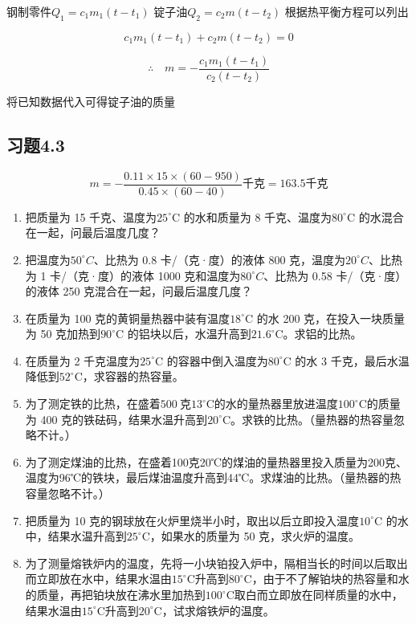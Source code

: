 钢制零件\(Q_{1}=c_{1}m_{1}(t-t_{1})\) 锭子油\(Q_{2}=c_{2}m(t-t_{2})\)
根据热平衡方程可以列出

\[
c _ {1} m _ {1} (t - t _ {1}) + c _ {2} m (t - t _ {2}) = 0
\]

\[
\therefore \quad m = - \frac {c _ {1} m _ {1} (t - t _ {1})}{c _ {2} (t - t _ {2})}
\]

将已知数据代入可得锭子油的质量

\subsection{习题4.3}\label{ux4e60ux98984.3}

\[
m = - \frac {0.11 \times 15 \times (60 - 950)}{0.45 \times (60 - 40)} \text{千克} = 163.5 \text{千克}
\]

\begin{enumerate}
\def\labelenumi{\arabic{enumi}.}
\item
  把质量为 15 千克、温度为\(25^{\circ}\)C 的水和质量为 8
  千克、温度为\(80^{\circ}\)C 的水混合在一起，问最后温度几度？
\item
  把温度为\(50^{\circ}C\)、比热为 0.8 卡/（克·度）的液体 800
  克，温度为\(20^{\circ}C\)、比热为 1 卡/（克·度）的液体 1000
  克和温度为\(80^{\circ}C\)、比热为 0.58 卡/（克·度）的液体 250
  克混合在一起，问最后温度几度？
\item
  在质量为 100 克的黄铜量热器中装有温度\(18^{\circ}\)C 的水 200
  克，在投入一块质量为 50 克加热到\(90^{\circ}\)C
  的铝块以后，水温升高到\(21.6^{\circ}\)C。求铝的比热。
\item
  在质量为 2 千克温度为\(25^{\circ}\)C 的容器中倒入温度为\(80^{\circ}\)C
  的水 3 千克，最后水温降低到\(52^{\circ}\)C，求容器的热容量。
\item
  为了测定铁的比热，在盛着\(500 \mathrm{~克} 13^{\circ} \mathrm{C}\)的水的量热器里放进温度\(100^{\circ} \mathrm{C}\)的质量为
  400
  克的铁砝码，结果水温升高到\(20^{\circ} \mathrm{C}\)。求铁的比热。（量热器的热容量忽略不计。）
\item
  为了测定煤油的比热，在盛着100克20℃的煤油的量热器里投入质量为200克、温度为96℃的铁块，最后煤油温度升高到44℃。求煤油的比热。（量热器的热容量忽略不计。）
\item
  把质量为 10
  克的钢球放在火炉里烧半小时，取出以后立即投入温度\(10^{\circ}\)C
  的水中，结果水温升高到\(25^{\circ}\)C，如果水的质量为 50
  克，求火炉的温度。
\item
  为了测量熔铁炉内的温度，先将一小块铂投入炉中，隔相当长的时间以后取出而立即放在水中，结果水温由\(15^{\circ} \mathrm{C}\)升高到\(80^{\circ} \mathrm{C}\)，由于不了解铂块的热容量和水的质量，再把铂块放在沸水里加热到\(100^{\circ} \mathrm{C}\)取白而立即放在同样质量的水中，结果水温由\(15^{\circ} \mathrm{C}\)升高到\(20^{\circ} \mathrm{C}\)，试求熔铁炉的温度。

\end{enumerate}
